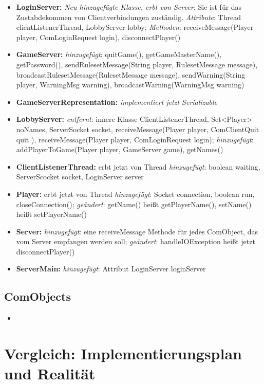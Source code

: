 \documentclass{article}
\begin{document}
\begin{itemize}
\item  \textbf{LoginServer:}  \textit{Neu hinzugefügte Klasse, erbt von Server}: Sie ist für das Zustabdekommen von Clientverbindungen zuständig. \textit{Attribute}:  Thread clientListenerThread,  LobbyServer lobby; \textit{Methoden}: receiveMessage(Player player, ComLoginRequest login), disconnectPlayer()
\item  \textbf{GameServer:} \textit{hinzugefügt}: quitGame(), getGameMasterName(), getPassword(), sendRulesetMessage(String player, RulesetMessage message), broadcastRulesetMessage(RulesetMessage message), sendWarning(String player, WarningMsg warning), broadcastWarning(WarningMsg warning)
\item  \textbf{GameServerRepresentation:} \textit{implementiert jetzt Serializable}
\item  \textbf{LobbyServer:} \textit{entfernt}: innere Klasse ClientListenerThread, Set<Player> noNames, ServerSocket socket, receiveMessage(Player player, ComClientQuit quit ), receiveMessage(Player player, ComLoginRequest login); \textit{hinzugefügt}: addPlayerToGame(Player player, GameServer game), getNames()
\item  \textbf{ClientListenerThread:} erbt jetzt von Thread  \textit{hinzugefügt}: boolean waiting, ServerScocket socket, LoginServer server
\item  \textbf{Player:}  erbt jetzt von Thread  \textit{hinzugefügt}: Socket connection, boolean run, closeConnection(); \textit{geändert}: getName() heißt getPlayerName(), setName() heißt setPlayerName()
\item  \textbf{Server:} \textit{hinzugefügt}: eine receiveMessage Methode für jedes ComObject, das vom Server empfangen werden soll; \textit{geändert}: handleIOException heißt jetzt disconnectPlayer()
\item  \textbf{ServerMain:} \textit{hinzugefügt}: Attribut LoginServer loginServer
\end{itemize}

\subsection{ComObjects}

\begin{itemize}
\item 
\end{itemize}

\newpage

\section{Vergleich: Implementierungsplan und Realität}
\end{document}
